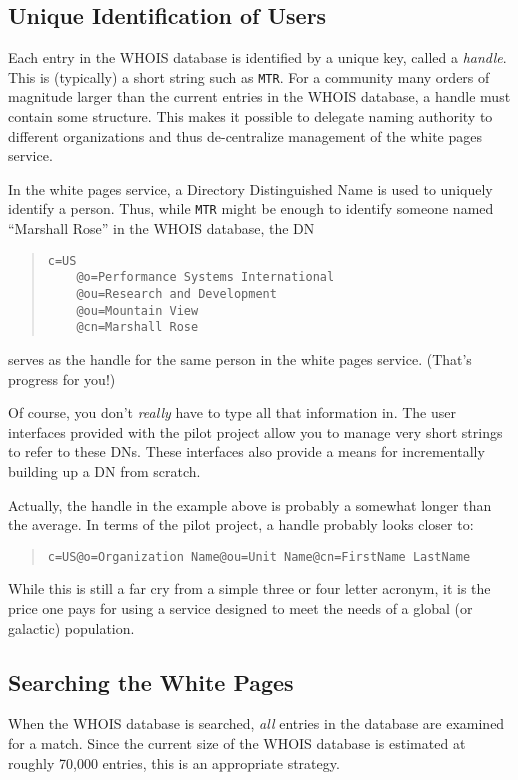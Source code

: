 \subsection	{Unique Identification of Users}
Each entry in the WHOIS database is identified by a unique key,
called a {\em handle}.
This is (typically) a short string such as \verb"MTR".
For a community many orders of magnitude larger than the current entries in
the WHOIS database,
a handle must contain some structure.
This makes it possible to delegate naming authority to different organizations
and thus de-centralize management of the white pages service.

In the white pages service,
a Directory Distinguished Name is used to uniquely identify a person.
Thus,
while \verb"MTR" might be enough to identify someone named ``Marshall Rose''
in the WHOIS database,
the DN
\begin{quote}\small\begin{verbatim}
c=US
    @o=Performance Systems International
    @ou=Research and Development
    @ou=Mountain View
    @cn=Marshall Rose
\end{verbatim}\end{quote}
serves as the handle for the same person in the white pages service.
(That's progress for you!)

Of course,
you don't {\em really\/} have to type all that information in.
The user interfaces provided with the pilot project allow you to manage very
short strings to refer to these DNs.
These interfaces also provide a means for incrementally building up a DN from
scratch.

Actually,
the handle in the example above is probably a somewhat longer than the average.
In terms of the pilot project,
a handle probably looks closer to:
\begin{quote}\small\begin{verbatim}
c=US@o=Organization Name@ou=Unit Name@cn=FirstName LastName
\end{verbatim}\end{quote}
While this is still a far cry from a simple three or four letter acronym,
it is the price one pays for using a service designed to meet the needs of a
global (or galactic) population.

\subsection	{Searching the White Pages}
When the WHOIS database is searched,
{\em all\/} entries in the database are examined for a match.
Since the current size of the WHOIS database is estimated at roughly 70,000
entries,
this is an appropriate strategy.

